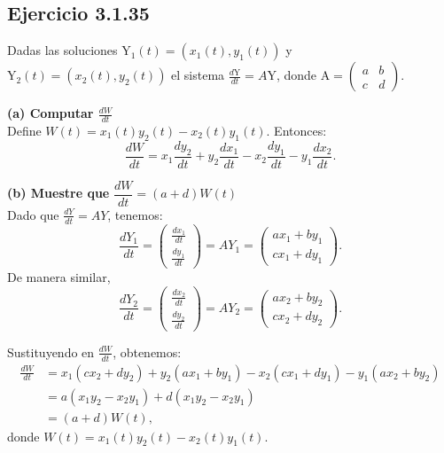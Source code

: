 \documentclass{report}
\begin{document}

    \subsection*{Ejercicio 3.1.35}

    Dadas las soluciones $\mathrm{Y}_1(t) = (x_1(t), y_1(t))$ y $\mathrm{Y}_2(t) = (x_2(t), y_2(t))$ el sistema $\frac{d \mathrm{Y}}{d t} = A \mathrm{Y}$, donde $\mathrm{A} = \begin{pmatrix} a & b \\ c & d \end{pmatrix}$.

    \noindent\textbf{(a) Computar $\frac{dW}{dt}$} \\
    Define $W(t) = x_1(t) y_2(t) - x_2(t) y_1(t)$. Entonces:
    \[
    \frac{d W}{d t} = x_1 \frac{d y_2}{d t} + y_2 \frac{d x_1}{d t} - x_2 \frac{d y_1}{d t} - y_1 \frac{d x_2}{d t}.
    \]

    \noindent\textbf{(b) Muestre que } $\dfrac{dW}{dt}=(a+d)W(t)$\\
    Dado que $\frac{d Y}{d t} = A Y$, tenemos:
    \[
    \frac{d Y_1}{d t} = \begin{pmatrix} \frac{d x_1}{d t} \\ \frac{d y_1}{d t} \end{pmatrix} = A Y_1 = \begin{pmatrix} a x_1 + b y_1 \\ c x_1 + d y_1 \end{pmatrix}.
    \]
    De manera similar,
    \[
    \frac{d Y_2}{d t} = \begin{pmatrix} \frac{d x_2}{d t} \\ \frac{d y_2}{d t} \end{pmatrix} = A Y_2 = \begin{pmatrix} a x_2 + b y_2 \\ c x_2 + d y_2 \end{pmatrix}.
    \]

    Sustituyendo en $\frac{dW}{dt}$, obtenemos:
    \[
    \begin{aligned}
    \frac{d W}{d t} &= x_1(c x_2 + d y_2) + y_2(a x_1 + b y_1) - x_2(c x_1 + d y_1) - y_1(a x_2 + b y_2) \\
    &= a(x_1 y_2 - x_2 y_1) + d(x_1 y_2 - x_2 y_1) \\
    &= (a + d) W(t),
    \end{aligned}
    \]
    donde $W(t) = x_1(t) y_2(t) - x_2(t) y_1(t)$.
\end{document}
